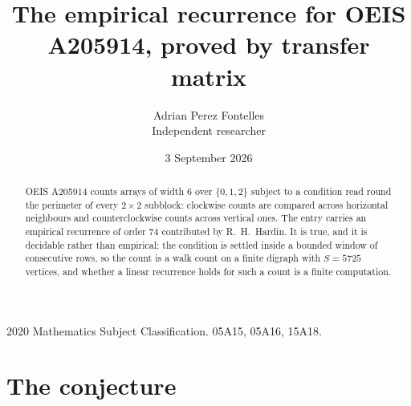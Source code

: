 \documentclass[11pt,a4paper]{article}
\title{The empirical recurrence for OEIS A205914, proved by transfer matrix}
\author{Adrian Perez Fontelles\\ \small Independent researcher}
\date{3 September 2026}
\theoremstyle{plain}
\theoremstyle{definition}
\begin{document}
\maketitle

\begin{abstract}
OEIS A205914 counts arrays of width $6$ over $\{0,1,2\}$ subject to a condition read round the
perimeter of every $2\times2$ subblock: clockwise counts are compared across horizontal neighbours and counterclockwise counts across vertical ones. The entry carries an empirical recurrence of
order $74$ contributed by R.~H.~Hardin. It is true, and it is decidable rather than
empirical: the condition is settled inside a bounded window of consecutive rows, so the
count is a walk count on a finite digraph with $S=5725$ vertices, and whether a linear
recurrence holds for such a count is a finite computation.
\end{abstract}

\noindent\small 2020 Mathematics Subject Classification. 05A15, 05A16, 15A18.\normalsize

\section{The conjecture}
\end{document}

